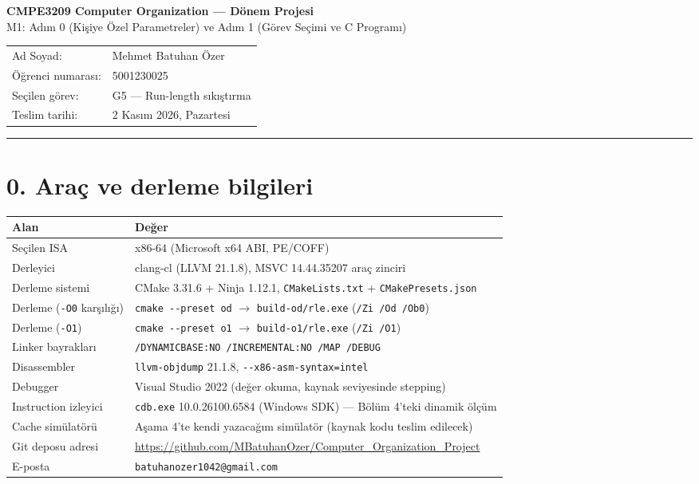 \documentclass[11pt,a4paper]{article}
\newcommand{\tl}{\texttt}
\begin{document}
\begin{center}
{\Large\bfseries CMPE3209 Computer Organization --- Dönem Projesi}\\[4pt]
{\large M1: Adım 0 (Kişiye Özel Parametreler) ve Adım 1 (Görev Seçimi ve C Programı)}\\[8pt]
\begin{tabular}{ll}
Ad Soyad: & Mehmet Batuhan Özer\\
Öğrenci numarası: & 5001230025\\
Seçilen görev: & G5 --- Run-length sıkıştırma\\
Teslim tarihi: & 2 Kasım 2026, Pazartesi\\
\end{tabular}
\end{center}

\vspace{2pt}\hrule\vspace{8pt}

\section*{0. Araç ve derleme bilgileri}

\begin{longtable}{p{4.4cm}p{10.6cm}}
\toprule
\textbf{Alan} & \textbf{Değer}\\
\midrule
Seçilen ISA & x86-64 (Microsoft x64 ABI, PE/COFF)\\
Derleyici & clang-cl (LLVM 21.1.8), MSVC 14.44.35207 araç zinciri\\
Derleme sistemi & CMake 3.31.6 + Ninja 1.12.1, \tl{CMakeLists.txt} + \tl{CMakePresets.json}\\
Derleme (\tl{-O0} karşılığı) & \tl{cmake -{}-preset od} $\rightarrow$ \tl{build-od/rle.exe} \quad (\tl{/Zi /Od /Ob0})\\
Derleme (\tl{-O1}) & \tl{cmake -{}-preset o1} $\rightarrow$ \tl{build-o1/rle.exe} \quad (\tl{/Zi /O1})\\
Linker bayrakları & \tl{/DYNAMICBASE:NO /INCREMENTAL:NO /MAP /DEBUG}\\
Disassembler & \tl{llvm-objdump} 21.1.8, \tl{-{}-x86-asm-syntax=intel}\\
Debugger & Visual Studio 2022 (değer okuma, kaynak seviyesinde stepping)\\
Instruction izleyici & \tl{cdb.exe} 10.0.26100.6584 (Windows SDK) --- Bölüm 4'teki dinamik ölçüm\\
Cache simülatörü & Aşama 4'te kendi yazacağım simülatör (kaynak kodu teslim edilecek)\\
Git deposu adresi & \url{https://github.com/MBatuhanOzer/Computer_Organization_Project}\\
E-posta & \tl{batuhanozer1042@gmail.com}\\
\bottomrule
\end{longtable}
\end{document}
